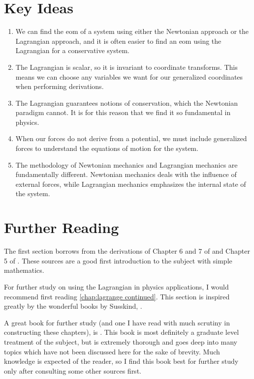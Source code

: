 \section{Key Ideas}
\begin{enumerate}
    \item We can find the \gls{eom} of a system using either the Newtonian approach or the \gls{Lagrangian} approach, and it is often easier to find an \gls{eom} using the \gls{Lagrangian} for a \gls{conservative} system.
    \item The \gls{Lagrangian} is scalar, so it is invariant to coordinate transforms. This means we can choose any variables we want for our generalized coordinates when performing derivations.
    \item The \gls{Lagrangian} guarantees notions of conservation, which the Newtonian paradigm cannot. It is for this reason that we find it so fundamental in physics.
    \item When our forces do not derive from a potential, we must include generalized forces to understand the equations of motion for the system.
    \item The methodology of Newtonian mechanics and \gls{Lagrangian} mechanics are fundamentally different. Newtonian mechanics deals with the influence of external forces, while \gls{Lagrangian} mechanics emphasizes the internal state of the system.
\end{enumerate}
\section{Further Reading}
The first section borrows from the derivations of Chapter 6 and 7 of  \cite{thornton_classical_nodate} and Chapter 5 of  \cite{cline_variational_2017}. These sources are a good first introduction to the subject with simple mathematics.

For further study on using the \gls{Lagrangian} in physics applications, I would recommend first reading \autoref{chap:lagrange continued}. This section is inspired greatly by the wonderful books by Susskind, \cite{susskind_general_2025,susskind_special_2019,susskind_quantum_2014,susskind_theoretical_2014}.

A great book for further study (and one I have read with much scrutiny in constructing these chapters), is \cite{goldstein_classical_2008}. This book is most definitely a graduate level treatment of the subject, but is extremely thorough and goes deep into many topics which have not been discussed here for the sake of brevity. Much knowledge is expected of the reader, so I find this book best for further study only after consulting some other sources first.


